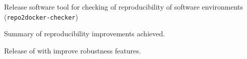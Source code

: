 \begin{workpackage}
\begin{wpdescription}
%

\end{wpdescription}

\begin{tasklist}






\end{tasklist}


\begin{wpdelivs}


  \begin{wpdeliv}[due=12,miles=startup,id=deliv-id-repo2docker-checker-software,dissem=PU,nature=OTHER,lead=SRL]
    {Release software tool for checking of reproducibility of software
      environments (\texttt{repo2docker-checker})}
  \end{wpdeliv}

  \begin{wpdeliv}[due=24,miles=final,id=repo2docker-checker-study-report,dissem=PU,nature=R,lead=SRL]
    {Summary of reproducibility improvements achieved.}
  \end{wpdeliv}

  \begin{wpdeliv}[due=24,miles=final,id=repo2docker-release24,dissem=PU,nature=R,lead=SRL]
    {Release of \repotodocker{} with improve robustness features.}
  \end{wpdeliv}

\end{wpdelivs}

\end{workpackage}

